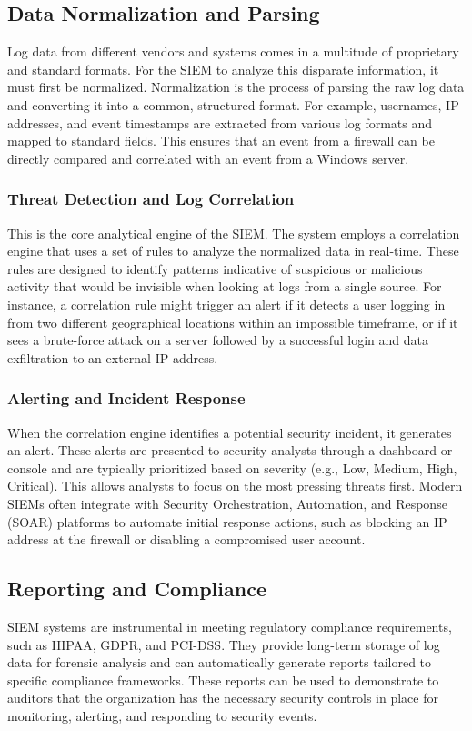\subsection{Data Normalization and Parsing}
Log data from different vendors and systems comes in a multitude of proprietary and standard formats. For the SIEM to analyze this disparate information, it must first be normalized. Normalization is the process of parsing the raw log data and converting it into a common, structured format. For example, usernames, IP addresses, and event timestamps are extracted from various log formats and mapped to standard fields. This ensures that an event from a firewall can be directly compared and correlated with an event from a Windows server.

\subsubsection{Threat Detection and Log Correlation}
This is the core analytical engine of the SIEM. The system employs a correlation engine that uses a set of rules to analyze the normalized data in real-time. These rules are designed to identify patterns indicative of suspicious or malicious activity that would be invisible when looking at logs from a single source. For instance, a correlation rule might trigger an alert if it detects a user logging in from two different geographical locations within an impossible timeframe, or if it sees a brute-force attack on a server followed by a successful login and data exfiltration to an external IP address.


\subsubsection{Alerting and Incident Response}
When the correlation engine identifies a potential security incident, it generates an alert. These alerts are presented to security analysts through a dashboard or console and are typically prioritized based on severity (e.g., Low, Medium, High, Critical). This allows analysts to focus on the most pressing threats first. Modern SIEMs often integrate with Security Orchestration, Automation, and Response (SOAR) platforms to automate initial response actions, such as blocking an IP address at the firewall or disabling a compromised user account.

\subsection{Reporting and Compliance}
SIEM systems are instrumental in meeting regulatory compliance requirements, such as HIPAA, GDPR, and PCI-DSS. They provide long-term storage of log data for forensic analysis and can automatically generate reports tailored to specific compliance frameworks. These reports can be used to demonstrate to auditors that the organization has the necessary security controls in place for monitoring, alerting, and responding to security events.


